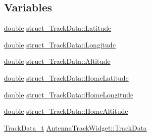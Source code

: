 \subsection*{Variables}
\begin{DoxyCompactItemize}
\item 
\hyperlink{_super_l_u_support_8h_a8956b2b9f49bf918deed98379d159ca7}{double} \hyperlink{group___antenna_track_gadget_plugin_ga412a0215352cff81241572b0637ca6d5}{struct\-\_\-\-Track\-Data\-::\-Latitude}
\item 
\hyperlink{_super_l_u_support_8h_a8956b2b9f49bf918deed98379d159ca7}{double} \hyperlink{group___antenna_track_gadget_plugin_gadd67067451f9adf6f25e45bcb7498a32}{struct\-\_\-\-Track\-Data\-::\-Longitude}
\item 
\hyperlink{_super_l_u_support_8h_a8956b2b9f49bf918deed98379d159ca7}{double} \hyperlink{group___antenna_track_gadget_plugin_ga528ec049631eed362529f9ea5fd30b99}{struct\-\_\-\-Track\-Data\-::\-Altitude}
\item 
\hyperlink{_super_l_u_support_8h_a8956b2b9f49bf918deed98379d159ca7}{double} \hyperlink{group___antenna_track_gadget_plugin_gad25500d6984ee3227abe9b2663c0a975}{struct\-\_\-\-Track\-Data\-::\-Home\-Latitude}
\item 
\hyperlink{_super_l_u_support_8h_a8956b2b9f49bf918deed98379d159ca7}{double} \hyperlink{group___antenna_track_gadget_plugin_ga297bb9a225f2fa6033327e0d99bc5eac}{struct\-\_\-\-Track\-Data\-::\-Home\-Longitude}
\item 
\hyperlink{_super_l_u_support_8h_a8956b2b9f49bf918deed98379d159ca7}{double} \hyperlink{group___antenna_track_gadget_plugin_ga0bb6374ee3a9a6f864fbd03a1c791256}{struct\-\_\-\-Track\-Data\-::\-Home\-Altitude}
\item 
\hyperlink{group___antenna_track_gadget_plugin_ga2a189738d52fd5df21e4a823d19ad1ac}{Track\-Data\-\_\-t} \hyperlink{group___antenna_track_gadget_plugin_ga18b3b7f2868671ca1d6e117f0bbccd90}{Antenna\-Track\-Widget\-::\-Track\-Data}
\end{DoxyCompactItemize}
